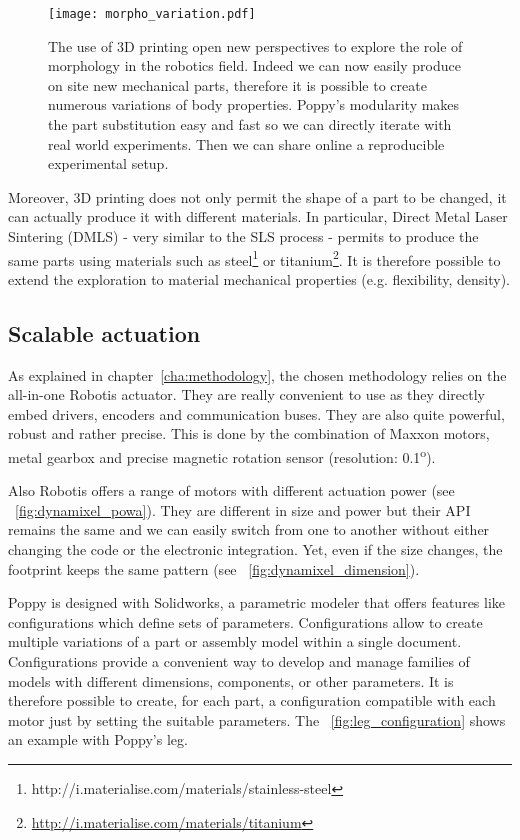 \begin{figure}[p]
    \centering
        \texttt{[image: morpho\_variation.pdf]}
    \caption{The use of 3D printing open new perspectives to explore the role of morphology in the robotics field. Indeed we can now easily produce on site new mechanical parts, therefore it is possible to create numerous variations of body properties. Poppy's modularity makes the part substitution easy and fast so we can directly iterate with real world experiments. Then we can share online a reproducible experimental setup.}
    \label{fig:exploring-morpho-poppy}
\end{figure}


Moreover, 3D printing does not only permit the shape of a part to be changed, it can actually produce it with different materials. In particular, Direct Metal Laser Sintering (DMLS) - very similar to the SLS process - permits to produce the same parts using materials such as steel\footnote{http://i.materialise.com/materials/stainless-steel} or titanium\footnote{\url{http://i.materialise.com/materials/titanium}}. It is therefore possible to extend the exploration to material mechanical properties (e.g. flexibility, density).


\subsection{Scalable actuation} %
\label{sub:scalable-actuation}
As explained in chapter~\ref{cha:methodology}, the chosen methodology relies on the all-in-one Robotis actuator. They are really convenient to use as they directly embed drivers, encoders and communication buses. They are also quite powerful, robust and rather precise. This is done by the combination of Maxxon motors, metal gearbox and precise magnetic rotation sensor (resolution: 0.1\textsuperscript{o}).

Also Robotis offers a range of motors with different actuation power (see \figurename~\ref{fig:dynamixel_powa}). They are different in size and power but their API remains the same and we can easily switch from one to another without either changing the code or the electronic integration. Yet, even if the size changes, the footprint keeps the same pattern (see \figurename~\ref{fig:dynamixel_dimension}).

Poppy is designed with Solidworks, a parametric modeler that offers features like configurations which define sets of parameters. Configurations allow to create multiple variations of a part or assembly model within a single document. Configurations provide a convenient way to develop and manage families of models with different dimensions, components, or other parameters. It is therefore possible to create, for each part, a configuration compatible with each motor just by setting the suitable parameters. The \figurename~\ref{fig:leg_configuration} shows an example with Poppy's leg.


